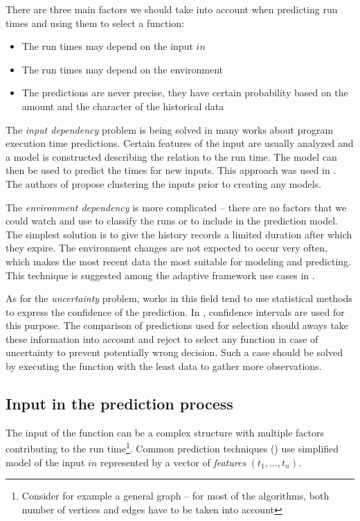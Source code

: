 There are three main factors we should take into account when predicting run times and using them to select a function:

\begin{itemize}
	\item The run times may depend on the input $in$
	\item The run times may depend on the environment
	\item The predictions are never precise, they have certain probability based on the amount and the character of the historical data
\end{itemize}

The \textit{input dependency} problem is being solved in many works about program execution time predictions. Certain features of the input are usually analyzed and a model is constructed describing the relation to the run time. The model can then be used to predict the times for new inputs. This approach was used in \cite{chun_mantis:_2010,goldsmith_measuring_2007}. The authors of \cite{smith_predicting_1998} propose clustering the inputs prior to creating any models.

The \textit{environment dependency} is more complicated -- there are no factors that we could watch and use to classify the runs or to include in the prediction model. The simplest solution is to give the history records a limited duration after which they expire. The environment changes are not expected to occur very often, which makes the most recent data the most suitable for modeling and predicting. This technique is suggested among the adaptive framework use cases in \cite{bulej_performance_2012}.

As for the \textit{uncertainty} problem, works in this field tend to use statistical methods to express the confidence of the prediction. In \cite{smith_predicting_1998}, confidence intervals are used for this purpose. The comparison of predictions used for selection should aways take these information into account and reject to select any function in case of uncertainty to prevent potentially wrong decision. Such a case should be solved by executing the function with the least data to gather more observations.

\subsection{Input in the prediction process}
\label{subsec:input_in_selection}

The input of the function can be a complex structure with multiple factors contributing to the run time\footnote{Consider for example a general graph -- for most of the algorithms, both number of vertices and edges have to be taken into account}. Common prediction techniques (\cite{chun_mantis:_2010,goldsmith_measuring_2007}) use simplified model of the input $in$ represented by a vector of \textit{features} $(t_1, \dots, t_n)$. 

